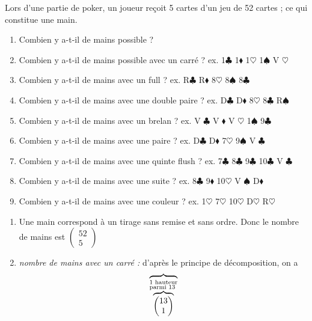 \documentclass{book}
\begin{document}
\begin{Exercice}[Poker]
Lors d'une partie de poker, un joueur reçoit 5 cartes d'un jeu de 52 cartes ; ce qui constitue une main.\\
\begin{enumerate}
\item Combien y a-t-il de mains possible ? 
\item Combien y a-t-il de mains possible avec un carré ? ex. 1$\clubsuit$ 1$\blacklozenge$ 1$\heartsuit$ 1$\spadesuit$ V $\heartsuit$
\item Combien y a-t-il de mains avec un full ? ex. R$\clubsuit$ R$\blacklozenge$ 8$\heartsuit$ 8$\spadesuit$ 8$\clubsuit$
\item  Combien y a-t-il de mains avec une double paire ? ex. D$\clubsuit$ D$\blacklozenge$ 8$\heartsuit$ 8$\clubsuit$ R$\spadesuit$
\item  Combien y a-t-il de mains avec un brelan ? ex. V $\clubsuit$ V $\blacklozenge$ V $\heartsuit$ 1$\spadesuit$ 9$\clubsuit$
\item  Combien y a-t-il de mains avec une paire ? ex. D$\clubsuit$ D$\blacklozenge$ 7$\heartsuit$ 9$\spadesuit$ V $\clubsuit$
\item  Combien y a-t-il de mains avec une quinte flush ? ex. 7$\clubsuit$ 8$\clubsuit$ 9$\clubsuit$ 10$\clubsuit$ V $\clubsuit$
\item  Combien y a-t-il de mains avec une suite ? ex. 8$\clubsuit$ 9$\blacklozenge$ 10$\heartsuit$ V $\spadesuit$ D$\blacklozenge$
\item  Combien y a-t-il de mains avec une couleur ? ex. 1$\heartsuit$ 7$\heartsuit$ 10$\heartsuit$ D$\heartsuit$ R$\heartsuit$
\end{enumerate}
\begin{Correction}
\begin{enumerate}
\item Une main correspond à un tirage sans remise et sans ordre. Donc le nombre de mains est $\begin{pmatrix}52\\5\end{pmatrix}$
\item \textit{nombre de mains avec un carré :} d'après le principe de décomposition,  on a  
$$\overbrace{\overbrace{\begin{pmatrix}13\\1\end{pmatrix}}^
{\begin{subarray}{l}\text{1 hauteur}\\
    \text{parmi 13}\end{subarray}}
}$$
\end{enumerate}
\end{Correction}
\end{Exercice}
\end{document}
